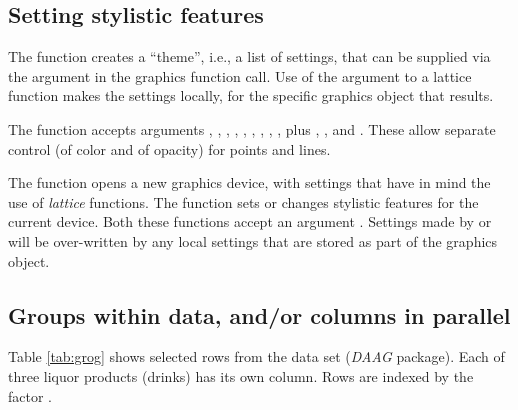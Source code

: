 \subsection{Setting stylistic features}\label{ss:style}

The function  creates a ``theme'', i.e., a list of
settings, that can be supplied via the argument  in
the graphics function call.  Use of the argument 
to a lattice function makes the settings locally, for the specific
graphics object that results.

The 
function  accepts arguments ,
, , , , ,
, , , plus ,
,  and .  These
allow separate control (of color and of opacity) for points and lines.

The function  opens a new graphics device, with
settings that have in mind the use of {\em lattice} functions. The
function  sets or changes stylistic features
for the current device. Both these functions accept an argument
.  Settings made by
 or  will be
over-written by any local settings that are stored as part of the
graphics object.

\subsection{Groups within data, and/or columns in parallel}\label{ss:grog}

Table \ref{tab:grog} shows selected rows from the data set 
(\textit{DAAG} package). Each of three liquor products (drinks) has
its own column. Rows are indexed by the factor .

